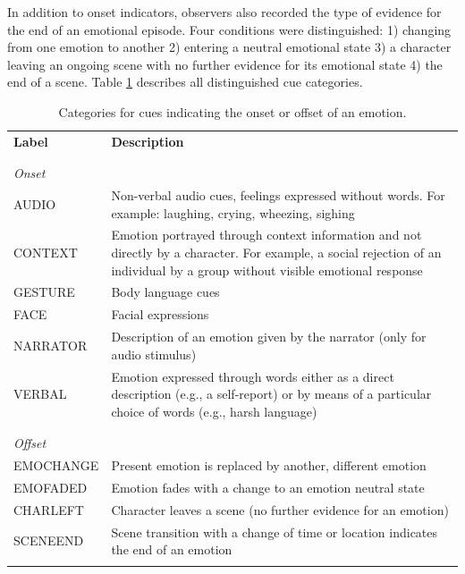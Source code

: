 \documentclass[10pt,a4paper,twocolumn]{article}
\begin{document}
In addition to onset indicators, observers also recorded the type of evidence
for the end of an emotional episode. Four conditions were distinguished: 1)
changing from one emotion to another 2) entering a neutral emotional state 3) a
character leaving an ongoing scene with no further evidence for its emotional
state 4) the end of a scene. Table \ref{tab:onoffset_indicators}
describes all distinguished cue categories.

\begin{table}
  \centering
  \begin{tabular}{lp{10cm}}
    \textbf{Label} & \textbf{Description} \\
    \\\hline\\
    \textit{Onset}\\
    AUDIO & Non-verbal audio cues, feelings expressed without words. For example: laughing, crying, wheezing, sighing\\
    CONTEXT & Emotion portrayed through context information and not directly by a character. For example, a social rejection of an individual by a group without visible emotional response\\
    GESTURE & Body language cues \\
    FACE & Facial expressions \\
    NARRATOR & Description of an emotion given by the narrator (only for audio stimulus)\\
    VERBAL & Emotion expressed through words either as a direct description (e.g., a self-report) or by means of a particular choice of words (e.g., harsh language)\\
    \\\hline\\
    \textit{Offset}\\
    EMOCHANGE & Present emotion is replaced by another, different emotion \\
    EMOFADED & Emotion fades with a change to an emotion neutral state \\
    CHARLEFT & Character leaves a scene (no further evidence for an emotion)\\
    SCENEEND & Scene transition with a change of time or location indicates the end of an emotion\\
    \\\hline

  \end{tabular}
  \caption{Categories for cues indicating the onset or offset of an emotion.}
  \label{tab:onoffset_indicators}
\end{table}
\end{document}

